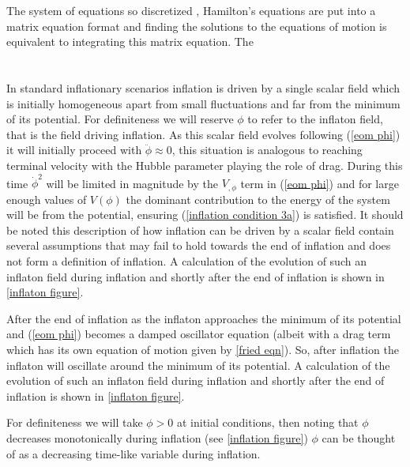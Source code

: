 \documentclass[letterpaper,11pt]{article}
\begin{document}
The system of equations so discretized , Hamilton's equations are put into a matrix equation format and finding the solutions to the equations of motion is equivalent to integrating this matrix equation. The 

\section{}
In standard inflationary scenarios inflation is driven by a single scalar field which is initially homogeneous apart from small fluctuations and far from the minimum of its potential. %
For definiteness we will reserve $\phi$ to refer to the inflaton field, that is the field driving inflation.
As this scalar field evolves following (\ref{eom phi}) it will initially proceed with $\ddot{\phi} \approx 0$, this situation is analogous to reaching terminal velocity with the Hubble parameter playing the role of drag. During this time $\dot{\phi}^2$ will be limited in magnitude by the $V_{,\phi}$ term in (\ref{eom phi}) and for large enough values of $V(\phi)$ the dominant contribution to the energy of the system will be from the potential, ensuring (\ref{inflation condition 3a}) is satisfied. It should be noted this description of how inflation can be driven by a scalar field contain several assumptions that may fail to hold towards the end of inflation and does not form a definition of inflation. A calculation of the evolution of such an inflaton field during inflation and shortly after the end of inflation is shown in \ref{inflaton figure}.

After the end of inflation as the inflaton approaches the minimum of its potential and (\ref{eom phi}) becomes a damped oscillator equation (albeit with a drag term which has its own equation of motion given by \ref{fried eqn}). So, after inflation the inflaton will oscillate around the minimum of its potential. A calculation of the evolution of such an inflaton field during inflation and shortly after the end of inflation is shown in \ref{inflaton figure}.

For definiteness we will take $\phi>0$ at initial conditions, then noting that $\phi$ decreases monotonically during inflation (see \ref{inflation figure}) $\phi$ can be thought of as a decreasing time-like variable during inflation.
\end{document}
